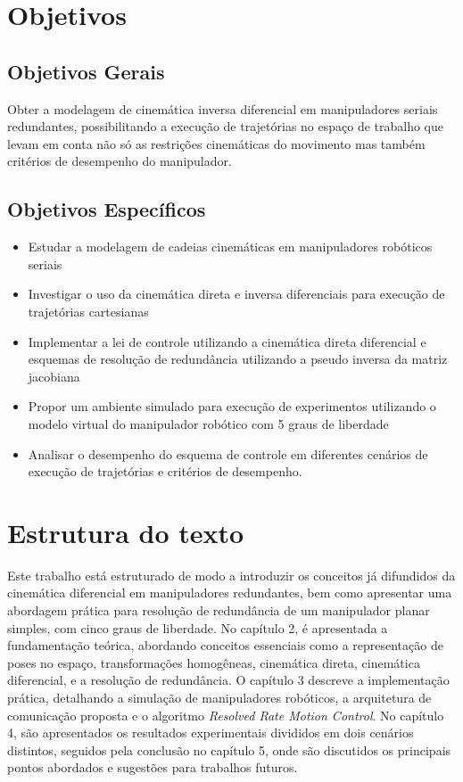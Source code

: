 \section{Objetivos}\label{sec:objectives}

\subsection{Objetivos Gerais}

Obter a modelagem de cinemática inversa diferencial em manipuladores seriais redundantes, possibilitando a execução de
trajetórias no espaço de trabalho que levam em conta não só as restrições cinemáticas do movimento mas também critérios
de desempenho do manipulador.

\subsection{Objetivos Específicos}
\begin{itemize}
	\item Estudar a modelagem de cadeias cinemáticas em manipuladores robóticos seriais
	\item Investigar o uso da cinemática direta e inversa diferenciais para execução de trajetórias cartesianas
	\item Implementar a lei de controle utilizando a cinemática direta diferencial e esquemas de resolução de redundância utilizando a pseudo inversa da matriz jacobiana
	\item Propor um ambiente simulado para execução de experimentos utilizando o modelo virtual do manipulador robótico com 5 graus de liberdade
	\item Analisar o desempenho do esquema de controle em diferentes cenários de execução de trajetórias e critérios de desempenho.
\end{itemize}

\section{Estrutura do texto}\label{sec:structure}

Este trabalho está estruturado de modo a introduzir os conceitos já difundidos da cinemática diferencial em manipuladores redundantes,
bem como apresentar uma abordagem prática para resolução de redundância de um manipulador planar simples, com cinco graus de liberdade.
No capítulo 2, é apresentada a fundamentação teórica, abordando conceitos essenciais como a representação de poses no
espaço, transformações homogêneas, cinemática direta, cinemática diferencial, e a resolução de redundância.
O capítulo 3 descreve a implementação prática, detalhando a simulação de manipuladores robóticos, a arquitetura de comunicação proposta
e o algoritmo \emph{Resolved Rate Motion Control}. No capítulo 4, são apresentados os resultados experimentais divididos em dois cenários
distintos, seguidos pela conclusão no capítulo 5, onde são discutidos os principais pontos abordados e sugestões para trabalhos futuros.
